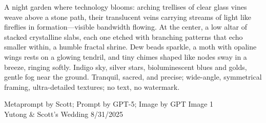 \documentclass[12pt]{article}
\begin{document}
\noindent
\begin{adjustbox}{max size={\textwidth}{\textheight}}
\begin{varwidth}{\textwidth}
\RaggedRight
\footnotesize
A night garden where technology blooms: arching trellises of clear glass vines weave above a stone path, their translucent veins carrying streams of light like fireflies in formation—visible bandwidth flowing. At the center, a low altar of stacked crystalline slabs, each one etched with branching patterns that echo smaller within, a humble fractal shrine. Dew beads sparkle, a moth with opaline wings rests on a glowing tendril, and tiny chimes shaped like nodes sway in a breeze, ringing softly. Indigo sky, silver stars, bioluminescent blues and golds, gentle fog near the ground. Tranquil, sacred, and precise; wide-angle, symmetrical framing, ultra-detailed textures; no text, no watermark.
\end{varwidth}
\end{adjustbox}
\vfill
{\raggedleft\footnotesize
Metaprompt by Scott; Prompt by GPT-5; Image by GPT Image 1 \\
Yutong \& Scott's Wedding 8/31/2025\par}
\end{document}
